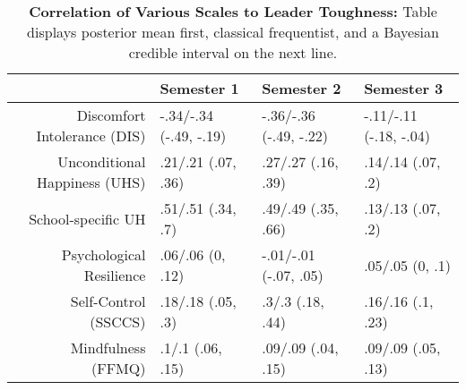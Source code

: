 \begin{table}[ht]
\centering
\begin{tabular}{rlll}
  \hline
 & Semester 1 & Semester 2 & Semester 3 \\ 
  \hline
Discomfort Intolerance (DIS) & -.34/-.34 (-.49, -.19) & -.36/-.36 (-.49, -.22) & -.11/-.11 (-.18, -.04) \\ 
  Unconditional Happiness (UHS) & .21/.21 (.07, .36) & .27/.27 (.16, .39) & .14/.14 (.07, .2) \\ 
  School-specific UH & .51/.51 (.34, .7) & .49/.49 (.35, .66) & .13/.13 (.07, .2) \\ 
  Psychological Resilience & .06/.06 (0, .12) & -.01/-.01 (-.07, .05) & .05/.05 (0, .1) \\ 
  Self-Control (SSCCS) & .18/.18 (.05, .3) & .3/.3 (.18, .44) & .16/.16 (.1, .23) \\ 
  Mindfulness (FFMQ) & .1/.1 (.06, .15) & .09/.09 (.04, .15) & .09/.09 (.05, .13) \\ 
   \hline
\end{tabular}
\caption{\textbf{Correlation of Various Scales to Leader Toughness:} Table displays posterior mean first, classical frequentist, and a Bayesian credible interval on the next line.} 
\label{tab:edc_corr}
\end{table}
